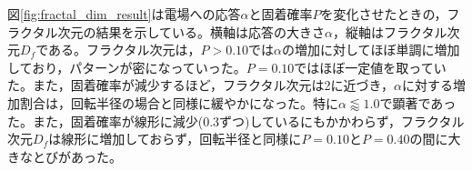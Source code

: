 \documentclass[autodetect-engine,dvi=dvipdfmx,a4paper,ja=standard,oneside,openany]{bxjsbook}
\begin{document}
図\ref{fig:fractal_dim_result}は電場への応答$\alpha$と固着確率$P$を変化させたときの，フラクタル次元の結果を示している。横軸は応答の大きさ$\alpha$，縦軸はフラクタル次元$D_f$である。フラクタル次元は，$P>0.10$では$\alpha$の増加に対してほぼ単調に増加しており，パターンが密になっていった。$P=0.10$ではほぼ一定値を取っていた。また，固着確率が減少するほど，フラクタル次元は2に近づき，$\alpha$に対する増加割合は，回転半径の場合と同様に緩やかになった。特に$\alpha\lessapprox1.0$で顕著であった。また，固着確率が線形に減少(0.3ずつ)しているにもかかわらず，フラクタル次元$D_f$は線形に増加しておらず，回転半径と同様に$P=0.10$と$P=0.40$の間に大きなとびがあった。
\ifdraft{
  
  
}{}
\end{document}
